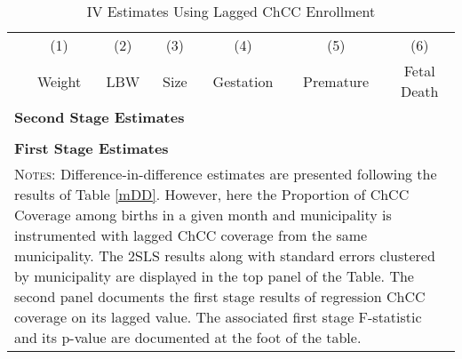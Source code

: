 \documentclass[12pt]{article}
\begin{document}
\begin{spacing}{1.4}
\begin{table}
  \begin{center}
    \caption{IV Estimates Using Lagged ChCC Enrollment}
    \label{tab:ChCC_IV}
    \begin{tabular}{lcccccc} \toprule 
      & (1)    & (2) & (3)  & (4)       & (5)       & (6)         \\
      & Weight & LBW & Size & Gestation & Premature & Fetal Death \\ \midrule
      \multicolumn{7}{l}{\textbf{Second Stage Estimates}} \\
       \\
      \multicolumn{7}{l}{\textbf{First Stage Estimates}} \\
      
      \midrule
      \multicolumn{7}{p{17.4cm}}{{\footnotesize \textsc{Notes}:
          Difference-in-difference estimates are presented following the
          results of Table \ref{mDD}.  However, here the Proportion of ChCC
          Coverage among births in a given month and municipality is
          instrumented with lagged ChCC coverage from the same municipality.
          The 2SLS results along with standard errors clustered by municipality
          are displayed in the top panel of the Table.  The second panel
          documents the first stage results of regression ChCC coverage
          on its lagged value.  The associated first stage F-statistic and its
          p-value are documented at the foot of the table.
      }} \\ \bottomrule
    \end{tabular}
  \end{center}
\end{table}


\end{spacing}
\end{document}

